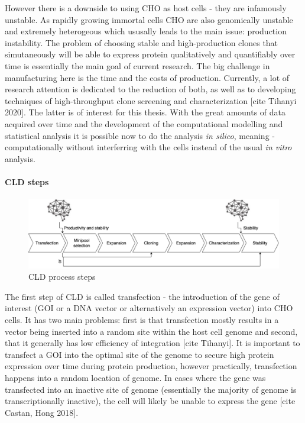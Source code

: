 However there is a downside to using CHO as host cells - they are infamously unstable. As rapidly growing immortal cells CHO are also genomically unstable and extremely heterogeous which ususally leads to the main issue: production instability. The problem of choosing stable and high-production clones that simutaneously will be able to express protein qualitatively and quantifiably over time is essentially the main goal of current research. The big challenge in manufacturing here is the time and the costs of production. Currently, a lot of research attention is dedicated to the reduction of both, as well as to developing techniques of high-throughput clone screening and characterization [cite Tihanyi 2020]. The latter is of interest for this thesis. With the great amounts of data acquired over time and the development of the computational modelling and statistical analysis it is possible now to do the analysis \textit{in silico}, meaning - computationally without interferring with the cells instead of the usual \textit{in vitro} analysis.

\paragraph{CLD steps}
\begin{figure}[H]
	\begin{center}
		\includegraphics[width=0.8\linewidth]{bilder/CLD.png}
		\caption{CLD process steps}\label{fig:cls-steps}
	\end{center}
\end{figure}

The first step of CLD is called transfection - the introduction of the gene of interest (GOI or a DNA vector or alternatively an expression vector) into CHO cells. It has two main problems: first is that transfection mostly results in a vector being inserted into a random site within the host cell genome and second, that it generally has low efficiency of integration [cite Tihanyi]. It is important to transfect a GOI into the optimal site of the genome to secure high protein expression over time during protein production, however practically, transfection happens into a random location of genome. In cases where the gene was transfected into an inactive site of genome (essentially the majority of genome is transcriptionally inactive), the cell will likely be unable to express the gene [cite Castan, Hong 2018].

